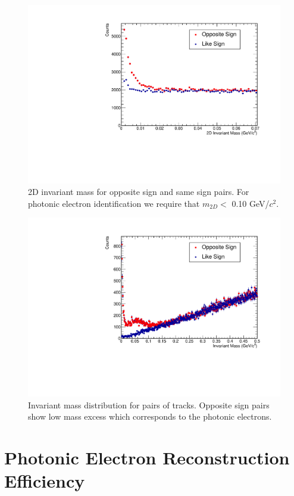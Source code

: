 \begin{figure}[htbp]
\begin{center}
\includegraphics[scale=.75]{Plots/NPE/2DInvMass_OS_LS.pdf}
\end{center}
\caption[2D Invariant Mass]{2D invariant mass for opposite sign and same sign pairs. For photonic electron identification we require that $m_{2D} <$ 0.10 GeV/$c^2$.}
\label{fig:2DInvMass}
\end{figure}

\begin{figure}[htbp]
\begin{center}
\includegraphics[scale=.75]{Plots/NPE/InvMass_OS_LS.pdf}
\end{center}
\caption[Invariant Mass]{Invariant mass distribution for pairs of tracks. Opposite sign pairs show low mass excess which corresponds to the photonic electrons.}
\label{fig:InvMass}
\end{figure}

\section{Photonic Electron Reconstruction Efficiency}
